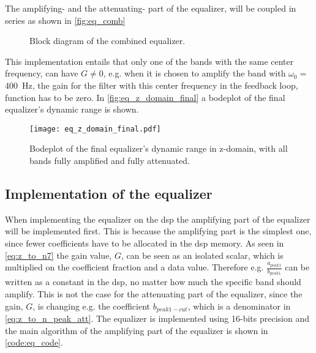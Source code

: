 The amplifying- and the attenuating- part of the equalizer, will be coupled in series as shown in \autoref{fig:eq_comb}

\begin{figure}[!h]
\centering
\def\svgwidth{0.72\columnwidth}
\scalebox{1}{}
\caption{Block diagram of the combined equalizer.}
		\label{fig:eq_comb}
\end{figure}

This implementation entails that only one of the bands with the same center frequency, can have $G \ne 0$, e.g. when it is chosen to amplify the band with $\omega_0 =$ \SI{400}{\hertz}, the gain for the filter with this center frequency in the feedback loop,  function has to be zero. 
In \autoref{fig:eq_z_domain_final} a bodeplot of the final equalizer's dynamic range is shown.

\begin{figure}[!h]
    \centering
        \texttt{[image: eq\_z\_domain\_final.pdf]}
        \caption{Bodeplot of the final equalizer's dynamic range in z-domain, with all bands fully amplified and fully attenuated.}
        \label{fig:eq_z_domain_final}
  \end{figure}
  
\subsection{Implementation of the equalizer}
When implementing the equalizer on the \gls{dsp} the amplifying part of the equalizer will be implemented first. This is because the amplifying part is the simplest one, since fewer coefficients have to be allocated in the \gls{dsp} memory. As seen in \autoref{eq:z_to_n7} the gain value, $G$, can be seen as an isolated scalar, which is multiplied on the coefficient fraction and a data value. Therefore e.g. $\frac{a_{peak1}}{b_{peak1}}$ can be written as a constant in the \gls{dsp}, no matter how much the specific band should amplify. This is not the case for the attenuating part of the equalizer, since the gain, $G$, is changing e.g. the coefficient $b_{peak1-cut}$, which is a denominator in \autoref{eq:z_to_n_peak_att}. 
The equalizer is implemented using 16-bits precision and the main algorithm of the amplifying part of the equalizer is shown in \autoref{code:eq_code}. 


